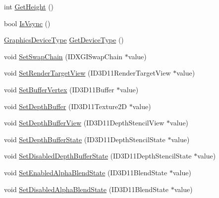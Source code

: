 \begin{DoxyCompactItemize}
int \hyperlink{class_osiris_i_1_1_graphics_1_1_devices_1_1_direct3_d_device_a77a333d62d43b632376844253b99a5ef}{Get\-Height} ()
\item 
bool \hyperlink{class_osiris_i_1_1_graphics_1_1_devices_1_1_direct3_d_device_acad32b37338bffab57d8ea5613e4bc55}{Is\-Vsync} ()
\item 
\hyperlink{namespace_osiris_i_1_1_graphics_1_1_devices_a6d815f0b8bccde3467ccf09f1f69e334}{Graphics\-Device\-Type} \hyperlink{class_osiris_i_1_1_graphics_1_1_devices_1_1_direct3_d_device_a884f657ae205c3b8bf108a6ddd138023}{Get\-Device\-Type} ()
\item 
void \hyperlink{class_osiris_i_1_1_graphics_1_1_devices_1_1_direct3_d_device_abd6ff12527f989e13b40a9edf1bd2fa2}{Set\-Swap\-Chain} (I\-D\-X\-G\-I\-Swap\-Chain $\ast$value)
\item 
void \hyperlink{class_osiris_i_1_1_graphics_1_1_devices_1_1_direct3_d_device_a87e56f2d1e4d764ad8fb47b7de55e401}{Set\-Render\-Target\-View} (I\-D3\-D11\-Render\-Target\-View $\ast$value)
\item 
void \hyperlink{class_osiris_i_1_1_graphics_1_1_devices_1_1_direct3_d_device_af7c3dcd0b0e18dd5d2f8d55b1cc7ec7c}{Set\-Buffer\-Vertex} (I\-D3\-D11\-Buffer $\ast$value)
\item 
void \hyperlink{class_osiris_i_1_1_graphics_1_1_devices_1_1_direct3_d_device_a7ca1beb29407a0822ba3cac5d72db64a}{Set\-Depth\-Buffer} (I\-D3\-D11\-Texture2\-D $\ast$value)
\item 
void \hyperlink{class_osiris_i_1_1_graphics_1_1_devices_1_1_direct3_d_device_a432c23b1b45b831640db7646bf4492fc}{Set\-Depth\-Buffer\-View} (I\-D3\-D11\-Depth\-Stencil\-View $\ast$value)
\item 
void \hyperlink{class_osiris_i_1_1_graphics_1_1_devices_1_1_direct3_d_device_a009fc4afaa949b77462c5506774e93f4}{Set\-Depth\-Buffer\-State} (I\-D3\-D11\-Depth\-Stencil\-State $\ast$value)
\item 
void \hyperlink{class_osiris_i_1_1_graphics_1_1_devices_1_1_direct3_d_device_a88cc12641dee6fd77db5ba1729c49ec6}{Set\-Disabled\-Depth\-Buffer\-State} (I\-D3\-D11\-Depth\-Stencil\-State $\ast$value)
\item 
void \hyperlink{class_osiris_i_1_1_graphics_1_1_devices_1_1_direct3_d_device_aa64fb9683e06988b137948a129572693}{Set\-Enabled\-Alpha\-Blend\-State} (I\-D3\-D11\-Blend\-State $\ast$value)
\item 
void \hyperlink{class_osiris_i_1_1_graphics_1_1_devices_1_1_direct3_d_device_a5c1bac1c255f89870fbbf14830637093}{Set\-Disabled\-Alpha\-Blend\-State} (I\-D3\-D11\-Blend\-State $\ast$value)

\end{DoxyCompactItemize}
